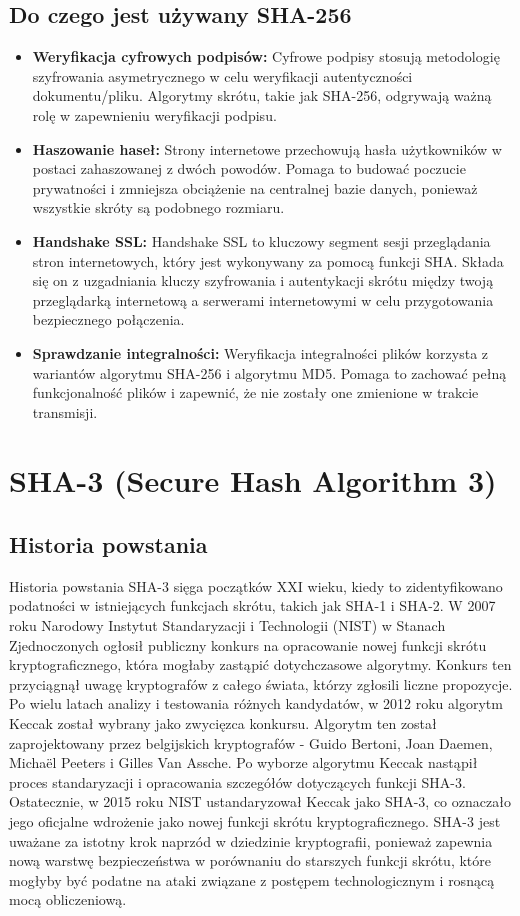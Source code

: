 \documentclass[12pt, a4paper]{article}
\begin{document}
\subsection{Do czego jest używany SHA-256}
\begin{itemize}
\item \textbf{Weryfikacja cyfrowych podpisów:} Cyfrowe podpisy stosują metodologię szyfrowania asymetrycznego w celu weryfikacji autentyczności dokumentu/pliku. Algorytmy skrótu, takie jak SHA-256, odgrywają ważną rolę w zapewnieniu weryfikacji podpisu.
\item \textbf{Haszowanie haseł:} Strony internetowe przechowują hasła użytkowników w postaci zahaszowanej z dwóch powodów. Pomaga to budować poczucie prywatności i zmniejsza obciążenie na centralnej bazie danych, ponieważ wszystkie skróty są podobnego rozmiaru.
\item \textbf{Handshake SSL:} Handshake SSL to kluczowy segment sesji przeglądania stron internetowych, który jest wykonywany za pomocą funkcji SHA. Składa się on z uzgadniania kluczy szyfrowania i autentykacji skrótu między twoją przeglądarką internetową a serwerami internetowymi w celu przygotowania bezpiecznego połączenia.
\item \textbf{Sprawdzanie integralności:} Weryfikacja integralności plików korzysta z wariantów algorytmu SHA-256 i algorytmu MD5. Pomaga to zachować pełną funkcjonalność plików i zapewnić, że nie zostały one zmienione w trakcie transmisji.
\end{itemize}
\section{SHA-3 (Secure Hash Algorithm 3)}
\subsection{Historia powstania}
Historia powstania SHA-3 sięga początków XXI wieku, kiedy to zidentyfikowano podatności w istniejących funkcjach skrótu, takich jak SHA-1 i SHA-2. W 2007 roku Narodowy Instytut Standaryzacji i Technologii (NIST) w Stanach Zjednoczonych ogłosił publiczny konkurs na opracowanie nowej funkcji skrótu kryptograficznego, która mogłaby zastąpić dotychczasowe algorytmy.
Konkurs ten przyciągnął uwagę kryptografów z całego świata, którzy zgłosili liczne propozycje. Po wielu latach analizy i testowania różnych kandydatów, w 2012 roku algorytm Keccak został wybrany jako zwycięzca konkursu. Algorytm ten został zaprojektowany przez belgijskich kryptografów - Guido Bertoni, Joan Daemen, Michaël Peeters i Gilles Van Assche.
Po wyborze algorytmu Keccak nastąpił proces standaryzacji i opracowania szczegółów dotyczących funkcji SHA-3. Ostatecznie, w 2015 roku NIST ustandaryzował Keccak jako SHA-3, co oznaczało jego oficjalne wdrożenie jako nowej funkcji skrótu kryptograficznego.
SHA-3 jest uważane za istotny krok naprzód w dziedzinie kryptografii, ponieważ zapewnia nową warstwę bezpieczeństwa w porównaniu do starszych funkcji skrótu, które mogłyby być podatne na ataki związane z postępem technologicznym i rosnącą mocą obliczeniową.
\end{document}
